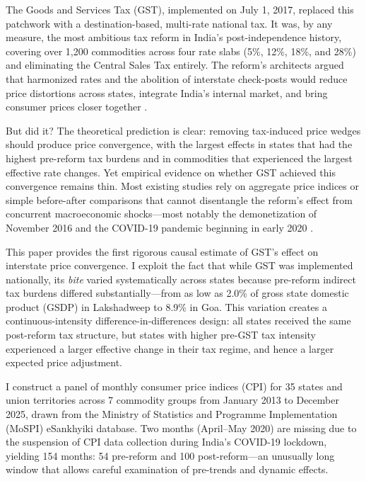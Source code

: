 \documentclass[12pt]{article}
\begin{document}
The Goods and Services Tax (GST), implemented on July 1, 2017, replaced this patchwork with a destination-based, multi-rate national tax. It was, by any measure, the most ambitious tax reform in India's post-independence history, covering over 1,200 commodities across four rate slabs (5\%, 12\%, 18\%, and 28\%) and eliminating the Central Sales Tax entirely. The reform's architects argued that harmonized rates and the abolition of interstate check-posts would reduce price distortions across states, integrate India's internal market, and bring consumer prices closer together \citep{agarwal2017india, subramanian2014challenges}.

But did it? The theoretical prediction is clear: removing tax-induced price wedges should produce price convergence, with the largest effects in states that had the highest pre-reform tax burdens and in commodities that experienced the largest effective rate changes. Yet empirical evidence on whether GST achieved this convergence remains thin. Most existing studies rely on aggregate price indices or simple before-after comparisons that cannot disentangle the reform's effect from concurrent macroeconomic shocks---most notably the demonetization of November 2016 and the COVID-19 pandemic beginning in early 2020 \citep{kumar2023gst}.

This paper provides the first rigorous causal estimate of GST's effect on interstate price convergence. I exploit the fact that while GST was implemented nationally, its \textit{bite} varied systematically across states because pre-reform indirect tax burdens differed substantially---from as low as 2.0\% of gross state domestic product (GSDP) in Lakshadweep to 8.9\% in Goa. This variation creates a continuous-intensity difference-in-differences design: all states received the same post-reform tax structure, but states with higher pre-GST tax intensity experienced a larger effective change in their tax regime, and hence a larger expected price adjustment.

I construct a panel of monthly consumer price indices (CPI) for 35 states and union territories across 7 commodity groups from January 2013 to December 2025, drawn from the Ministry of Statistics and Programme Implementation (MoSPI) eSankhyiki database. Two months (April--May 2020) are missing due to the suspension of CPI data collection during India's COVID-19 lockdown, yielding 154 months: 54 pre-reform and 100 post-reform---an unusually long window that allows careful examination of pre-trends and dynamic effects.
\end{document}
